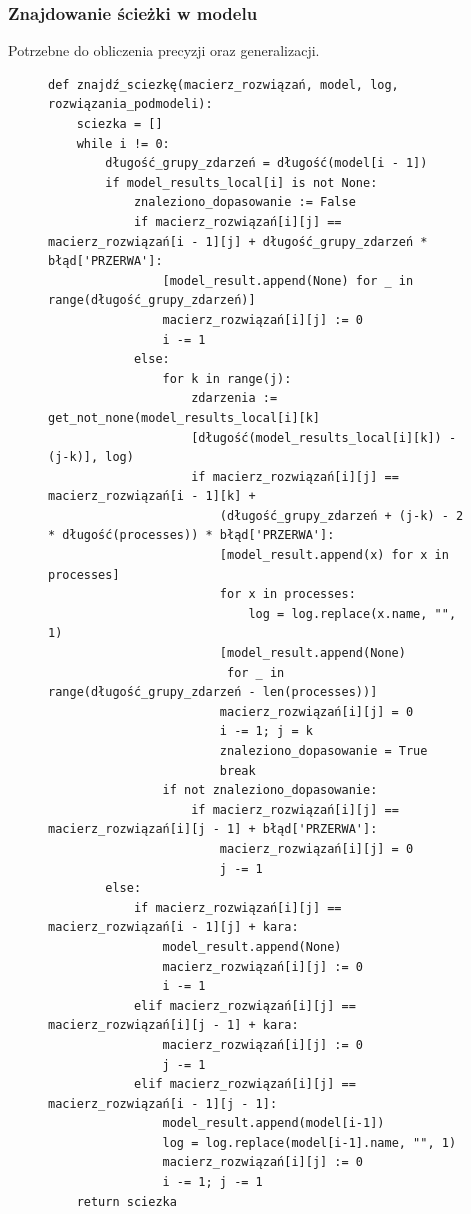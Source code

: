 \subsubsection{Znajdowanie ścieżki w modelu}
Potrzebne do obliczenia precyzji oraz generalizacji.
\begin{figure}[!ht]
\lstset{caption=Znajdowanie ścieżki w modelu, captionpos=b}
\lstset{label=src:traceback, frame=single}
\begin{lstlisting}
def znajdź_sciezkę(macierz_rozwiązań, model, log, rozwiązania_podmodeli):
    sciezka = []
    while i != 0:
        długość_grupy_zdarzeń = długość(model[i - 1])
        if model_results_local[i] is not None:
            znaleziono_dopasowanie := False
            if macierz_rozwiązań[i][j] == macierz_rozwiązań[i - 1][j] + długość_grupy_zdarzeń * błąd['PRZERWA']:
                [model_result.append(None) for _ in range(długość_grupy_zdarzeń)]
                macierz_rozwiązań[i][j] := 0
                i -= 1
            else:
                for k in range(j):
                    zdarzenia := get_not_none(model_results_local[i][k]
                    [długość(model_results_local[i][k]) - (j-k)], log)
                    if macierz_rozwiązań[i][j] == macierz_rozwiązań[i - 1][k] + 
                    	(długość_grupy_zdarzeń + (j-k) - 2 * długość(processes)) * błąd['PRZERWA']:
                        [model_result.append(x) for x in processes]
                        for x in processes:
                            log = log.replace(x.name, "", 1)
                        [model_result.append(None) 
                         for _ in range(długość_grupy_zdarzeń - len(processes))]
                        macierz_rozwiązań[i][j] = 0
                        i -= 1; j = k
                        znaleziono_dopasowanie = True
                        break
                if not znaleziono_dopasowanie:
                    if macierz_rozwiązań[i][j] == macierz_rozwiązań[i][j - 1] + błąd['PRZERWA']:
                        macierz_rozwiązań[i][j] = 0
                        j -= 1
        else:
            if macierz_rozwiązań[i][j] == macierz_rozwiązań[i - 1][j] + kara:
                model_result.append(None)
                macierz_rozwiązań[i][j] := 0
                i -= 1
            elif macierz_rozwiązań[i][j] == macierz_rozwiązań[i][j - 1] + kara:
                macierz_rozwiązań[i][j] := 0
                j -= 1
            elif macierz_rozwiązań[i][j] == macierz_rozwiązań[i - 1][j - 1]:
                model_result.append(model[i-1])
                log = log.replace(model[i-1].name, "", 1)
                macierz_rozwiązań[i][j] := 0
                i -= 1; j -= 1
    return sciezka
\end{lstlisting}
\end{figure}
\clearpage
